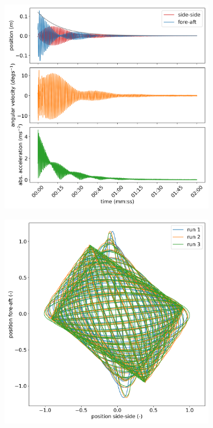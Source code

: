 \documentclass{article}
\begin{document}
\begin{figure}

    \centering
    \begin{subfigure}[b]{0.45\textwidth}
        \centering
        \includegraphics[width=\textwidth]{../results/experiment/high_mass_acceleration.png}
    \end{subfigure}
    \begin{subfigure}[b]{0.45\textwidth}
        \centering
         \includegraphics[width=\textwidth]{../results/experiment/high_mass_orbit.png}
    \end{subfigure}
    

\end{figure}
\end{document}
